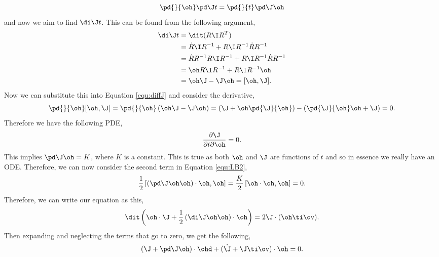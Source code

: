 \begin{equation}
  \pd{}{\oh}\pd \J t = \pd{}{t}\pd \J \oh\label{equ:diffJ}
\end{equation}
and now we aim to find $\di \J t$. This can be found from the following argument,
\begin{align*}
  \di\J t &= \dit (R\I R^T)\\
  &= \dot R\I R^{-1} + R\I R^{-1}\dot RR^{-1} \\
  &= \dot R R^{-1}R\I R^{-1} + R\I R^{-1}\dot RR^{-1}\\
  &= \oh R\I R^{-1} + R\I R^{-1}\oh \\
  &= \oh\J - \J\oh = [\oh, \J].
\end{align*}
\noindent
Now we can substitute this into Equation \ref{equ:diffJ} and consider the derivative,
$$ \pd{}{\oh} [\oh, \J] = \pd{}{\oh} \left( \oh\J - \J\oh \right) = \left(\J + \oh\pd{\J}{\oh}\right) - \left(\pd{\J}{\oh}\oh + \J\right) = 0. $$
Therefore we have the following PDE,
$$ \frac{\partial\J}{\partial t\partial \oh} = 0. $$
This implies $\pd \J \oh = K$, where $K$ is a constant. This is true as both $\oh$ and $\J$ are functions of $t$ and so in essence we really have an ODE. Therefore, we can now consider the second term in Equation \ref{equ:LB2},
$$ \frac{1}{2}\left[\left(\pd \J \oh\oh\right)\cdot \oh, \oh\right] = \frac{K}{2}\left[ \oh \cdot \oh, \oh \right] = 0. $$
Therefore, we can write our equation as this,
$$ \dit \left( \oh \cdot \J + \frac{1}{2}\left( \di \J \oh \oh \right) \cdot \oh \right) = 2\J \cdot (\oh \ti \ov). $$
Then expanding and neglecting the terms that go to zero, we get the following,
$$ \left( \J + \pd \J \oh \right) \cdot \ohd + (\dot\J + \J \ti \ov) \cdot \oh = 0. $$

